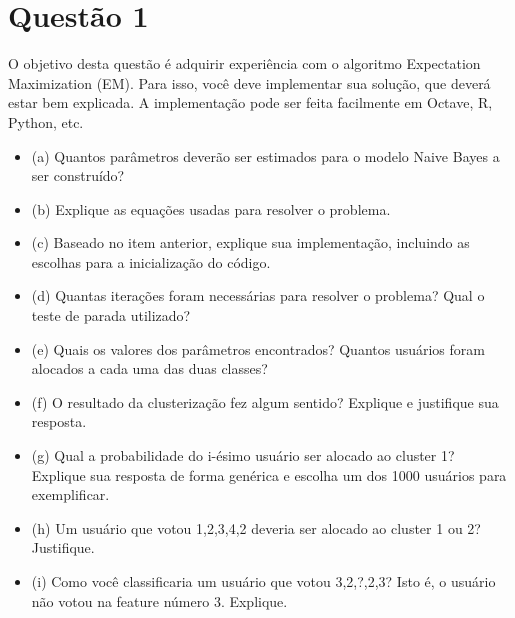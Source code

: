 \section*{Questão 1}

O objetivo desta questão é adquirir experiência com o algoritmo Expectation Maximization (EM). Para isso, você deve implementar sua solução, que deverá estar bem explicada. A implementação pode ser feita facilmente em Octave, R, Python, etc.

\begin{itemize}
    \item (a) Quantos parâmetros deverão ser estimados para o modelo Naive Bayes a ser construído?
    \item (b) Explique as equações usadas para resolver o problema.
    \item (c) Baseado no item anterior, explique sua implementação, incluindo as escolhas para a inicialização do código.
    \item (d) Quantas iterações foram necessárias para resolver o problema? Qual o teste de parada utilizado?
    \item (e) Quais os valores dos parâmetros encontrados? Quantos usuários foram alocados a cada uma das duas classes?
    \item (f) O resultado da clusterização fez algum sentido? Explique e justifique sua resposta.
    \item (g) Qual a probabilidade do i-ésimo usuário ser alocado ao cluster 1? Explique sua resposta de forma genérica e escolha um dos 1000 usuários para exemplificar.
    \item (h) Um usuário que votou 1,2,3,4,2 deveria ser alocado ao cluster 1 ou 2? Justifique.
    \item (i) Como você classificaria um usuário que votou 3,2,?,2,3? Isto é, o usuário não votou na feature número 3. Explique.
\end{itemize}

